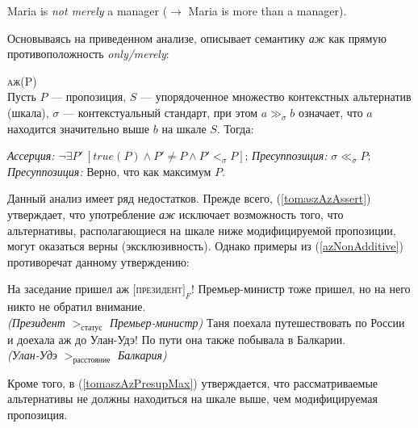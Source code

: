 \documentclass[a4paper, titlepage, 14pt]{article}
\begin{document}
\begin{exe}
    \ex Maria is \textit{not merely} a manager ($ \rightarrow $ Maria is more than a manager).
\end{exe}

Основываясь на приведенном анализе, \citep{tomaszevicz2011az} описывает семантику \textit{аж} как прямую противоположность \textit{only/merely}:

\begin{exe}
    \ex \textsc{аж(P)} \\ {\footnotesize Пусть $ P $ --- пропозиция, $ S $ --- упорядоченное множество контекстных альтернатив (шкала), $ \sigma $ --- контекстуальный стандарт, при  этом $ a \gg_{\sigma} b $ означает, что $ a $ находится значительно выше $ b $ на шкале $ S $. Тогда:} \begin{xlist}
        \ex \label{tomaszAzAssert} \textit{Ассерция:} $ \lnot \exists P'\ [ true(P) \land P' \neq P \land P' <_{\sigma} P] $;
        \ex \textit{Пресуппозиция:} $ \sigma \ll_{\sigma} P $;
        \ex \label{tomaszAzPresupMax} \textit{Пресуппозиция:} Верно, что как максимум $ P $.
    \end{xlist}
\end{exe}

Данный анализ имеет ряд недостатков. Прежде всего, (\ref{tomaszAzAssert}) утверждает, что употребление \textit{аж} исключает возможность того, что альтернативы, располагающиеся на шкале ниже модифицируемой пропозиции, могут оказаться верны (эксклюзивность). Однако примеры из (\ref{azNonAdditive}) противоречат данному утверждению:

 \begin{exe}
    \ex \label{azNonAdditive} \begin{xlist}
        \ex На заседание пришел аж $ [ $\textsc{президент}$ ]_F $! Премьер-министр тоже пришел, но на него никто не обратил внимание. \\
            \textit{(Президент} $ >_{\text{статус}} $ \textit{Премьер-министр)}
        \ex Таня поехала путешествовать по России и доехала аж до Улан-Удэ! По пути она также побывала в Балкарии. \\
        \textit{(Улан-Удэ} $ >_{\text{расстояние}} $ \textit{Балкария)}
    \end{xlist}
\end{exe}

Кроме того, в (\ref{tomaszAzPresupMax}) утверждается, что рассматриваемые альтернативы не должны находиться на шкале выше, чем модифицируемая пропозиция.
\end{document}
